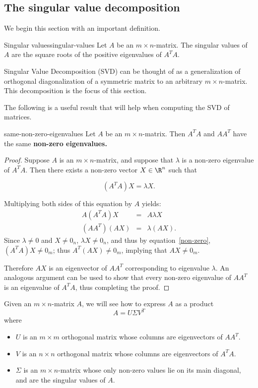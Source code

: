 \subsection{The singular value decomposition}

We begin this section with an important definition.

\begin{definition}{Singular values}{singular-values}
Let $A$ be an $m\times n$-matrix. The singular values of $A$ are the square roots of the positive
eigenvalues of $A^TA$.
\end{definition}

Singular Value Decomposition (SVD) can be thought of as
a generalization of orthogonal diagonalization of a symmetric matrix
to an arbitrary $m\times n$-matrix. This decomposition is the focus of this section.

The following is a useful result that will help when computing the SVD of matrices.

\begin{proposition}{}{same-non-zero-eigenvalues}
Let $A$ be an $m \times n$-matrix. Then $A^TA$ and $AA^T$ have the same \bf{non-zero} eigenvalues.
\end{proposition}

\begin{proof}
Suppose $A$ is an $m\times n$-matrix, and suppose that  $\lambda$ is a non-zero eigenvalue of $A^TA$.
Then there exists a non-zero vector $X\in \R^n$ such that

\begin{equation}\label{non-zero}
(A^TA)X=\lambda X.
\end{equation}

Multiplying both sides of this equation by $A$ yields:
\begin{eqnarray*}
A(A^TA)X & = & A\lambda X\\
(AA^T)(AX) & = & \lambda (AX).
\end{eqnarray*}
Since $\lambda\neq 0$ and $X\neq 0_n$, $\lambda X\neq 0_n$,
and thus by equation~\eqref{non-zero},
$(A^TA)X\neq 0_m$; thus $A^T(AX)\neq 0_m$,
implying that $AX\neq 0_m$.

Therefore $AX$ is an eigenvector of $AA^T$ corresponding to eigenvalue
$\lambda$.  An analogous argument can be used to show that every
non-zero eigenvalue of $AA^T$ is an eigenvalue of $A^TA$, thus
completing the proof.
\end{proof}

Given an $m\times n$-matrix $A$, we will see how to express $A$ as a product
\[ A=U\Sigma V^T\]
where
\begin{itemize}
\item $U$ is an $m\times m$ orthogonal matrix whose columns are
eigenvectors of $AA^T$.
\item $V$ is an $n\times n$ orthogonal matrix whose columns are
eigenvectors of $A^TA$.
\item $\Sigma$ is an $m\times n$-matrix whose only non-zero values
lie on its main diagonal, and are the singular values of $A$.
\end{itemize}

